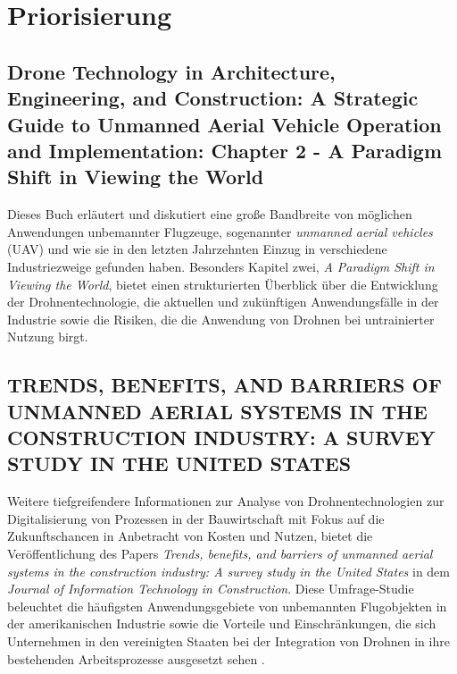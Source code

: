 \chapter{Priorisierung}\label{ch:priorisation}

\section{Drone Technology in Architecture, Engineering, and Construction: A Strategic Guide to Unmanned Aerial Vehicle Operation and Implementation: Chapter 2 - A Paradigm Shift in Viewing the World}

Dieses Buch \cite{Tal2021} erläutert und diskutiert eine große Bandbreite von möglichen Anwendungen unbemannter Flugzeuge, sogenannter \textit{unmanned aerial vehicles} (UAV) und wie sie in den letzten Jahrzehnten Einzug in verschiedene Industriezweige gefunden haben.
Besonders Kapitel zwei, \textit{A Paradigm Shift in Viewing the World}, bietet einen strukturierten Überblick über die Entwicklung der Drohnentechnologie, die aktuellen und zukünftigen Anwendungsfälle in der Industrie sowie die Risiken, die die Anwendung von Drohnen bei untrainierter Nutzung birgt.

\section{TRENDS, BENEFITS, AND BARRIERS OF UNMANNED AERIAL SYSTEMS IN THE CONSTRUCTION INDUSTRY: A SURVEY STUDY IN THE UNITED STATES}

Weitere tiefgreifendere Informationen zur Analyse von Drohnentechnologien zur Digitalisierung von Prozessen in der Bauwirtschaft mit Fokus auf die Zukunftschancen in Anbetracht von Kosten und Nutzen, bietet die Veröffentlichung des Papers \textit{Trends, benefits, and barriers of unmanned aerial systems in the construction industry: A survey study in the United States} in dem \textit{Journal of Information Technology in Construction}.
Diese Umfrage-Studie beleuchtet die häufigsten Anwendungsgebiete von unbemannten Flugobjekten in der amerikanischen Industrie sowie die Vorteile und Einschränkungen, die sich Unternehmen in den vereinigten Staaten bei der Integration von Drohnen in ihre bestehenden Arbeitsprozesse ausgesetzt sehen \cite{abaeano2021trends}.